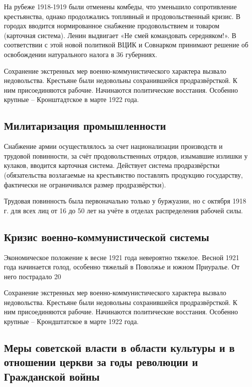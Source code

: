 На рубеже 1918-1919 были отменены комбеды, что уменьшило сопротивление крестьянства, однако продолжались топливный и продовольственный кризис. В городах вводится нормированное снабжение продовольствием и товаром (карточная система). Ленин выдвигает «Не смей командовать середняком!». В соответствии с этой новой политикой ВЦИК и Совнарком принимают решение об освобождении натурального налога в 36 губерниях.

Сохранение экстренных мер военно-коммунистического характера вызвало недовольства. Крестьяне были недовольны сохранившейся продразвёрсткой. К ним присоединяются рабочие. Начинаются политические восстания. Особенно крупные – Кронштадтское в марте 1922 года.

\subsection{Милитаризация промышленности}

Снабжение армии осуществлялось за счет национализации производств и трудовой повинности, за счёт продовольственных отрядов, изымавшие излишки у кулаков, вводится карточная система. Действует система продразвёрстки (обязательства возлагаемые на крестьянство поставлять продукцию государству, фактически не ограничивался размер продразвёрстки).

Трудовая повинность была первоначально только у буржуазии, но с октября 1918 г. для всех лиц от 16 до 50 лет на учёте в отделах распределения рабочей силы.

\subsection{Кризис военно-коммунистической системы}
Экономическое положение к весне 1921 года невероятно тяжелое. Весной 1921 года начинается голод, особенно тяжелый в Поволжье и южном Приуралье. От него пострадало 20%

Сохранение экстренных мер военно-коммунистического характера вызвало недовольства. Крестьяне были недовольны сохранившейся продразвёрсткой. К ним присоединяются рабочие. Начинаются политические восстания. Особенно крупные – Крондштатское в марте 1922 года.

\subsection{Меры советской власти в области культуры и в отношении церкви за годы революции и Гражданской войны}


